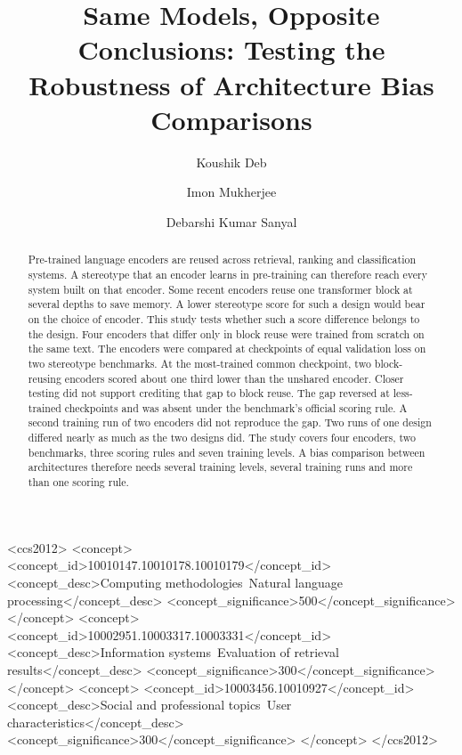 \documentclass[sigconf,natbib=true]{acmart}
\begin{document}
\title{Same Models, Opposite Conclusions: Testing the Robustness of
       Architecture Bias Comparisons}

\author{Koushik Deb}

\author{Imon Mukherjee}

\author{Debarshi Kumar Sanyal}

\renewcommand{\shortauthors}{Deb et al.}

\begin{abstract}
Pre-trained language encoders are reused across retrieval, ranking and
classification systems. A stereotype that an encoder learns in pre-training can
therefore reach every system built on that encoder. Some recent encoders reuse
one transformer block at several depths to save memory. A lower stereotype score
for such a design would bear on the choice of encoder. This study tests whether
such a score difference belongs to the design. Four encoders that differ only in
block reuse were trained from scratch on the same text. The encoders were
compared at checkpoints of equal validation loss on two stereotype benchmarks.
At the most-trained common checkpoint, two block-reusing encoders scored about
one third lower than the unshared encoder. Closer testing did not support
crediting that gap to block reuse. The gap reversed at less-trained checkpoints
and was absent under the benchmark's official scoring rule. A second training
run of two encoders did not reproduce the gap. Two runs of one design differed
nearly as much as the two designs did. The study covers four encoders, two
benchmarks, three scoring rules and seven training levels. A bias comparison
between architectures therefore needs several training levels, several training
runs and more than one scoring rule.
\end{abstract}

\begin{CCSXML}
<ccs2012>
<concept>
<concept_id>10010147.10010178.10010179</concept_id>
<concept_desc>Computing methodologies~Natural language processing</concept_desc>
<concept_significance>500</concept_significance>
</concept>
<concept>
<concept_id>10002951.10003317.10003331</concept_id>
<concept_desc>Information systems~Evaluation of retrieval results</concept_desc>
<concept_significance>300</concept_significance>
</concept>
<concept>
<concept_id>10003456.10010927</concept_id>
<concept_desc>Social and professional topics~User characteristics</concept_desc>
<concept_significance>300</concept_significance>
</concept>
</ccs2012>
\end{CCSXML}
\end{document}
